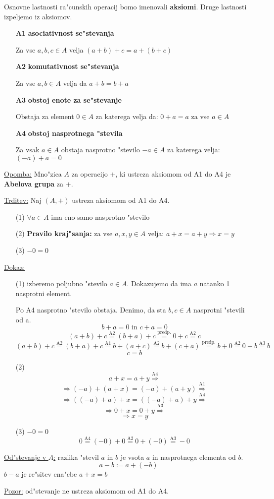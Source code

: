 Osnovne lastnosti ra"cunskih operacij bomo imenovali \textbf{aksiomi}. Druge lastnosti izpeljemo iz aksiomov.
\begin{itemize}
	\item[\textbf{A1}] \textbf{asociativnost se"stevanja}

	Za vse \(a, b, c \in A\) velja \((a + b) + c = a + (b + c)\)
	\item[\textbf{A2}] \textbf{komutativnost se"stevanja}
	
	Za vse \(a, b \in A\) velja da \(a + b = b + a\)
	
	\item[\textbf{A3}] \textbf{obstoj enote za se"stevanje}
	
	Obstaja za element \(0 \in A\) za katerega velja da: \(0 + a = a\) za vse \(a \in A\)
	
	\item[\textbf{A4}] \textbf{obstoj nasprotnega "stevila}
	
	Za vsak \(a \in A\) obstaja nasprotno "stevilo \(-a \in A\) za katerega velja: \((-a) + a = 0\)
\end{itemize}

\underline{Opomba:} Mno"zica \(A\) za operacijo \(+\), ki ustreza aksiomom od A1 do A4 je \textbf{Abelova grupa} za \(+\).

\underline{Trditev:} Naj \((A, +)\) ustreza aksiomom od A1 do A4.
\begin{itemize}
	\item[(1)] \(\forall a \in A \) ima eno samo nasprotno "stevilo
	\item[(2)] \textbf{Pravilo kraj"sanja:} za vse \(a, x, y \in A\) velja: \(a + x = a + y \Rightarrow x = y\)
	\item[(3)] \(-0 = 0\)
\end{itemize}

\underline{Dokaz:}
\begin{itemize}
	\item[(1)] izberemo poljubno "stevilo \(a \in A\). Dokazujemo da ima \(a\) natanko 1 nasprotni element.
	
	Po A4 nasprotno "stevilo obstaja. Denimo, da sta \(b, c \in A\) nasprotni "stevili od a.
	\[b + a = 0\text{ in }c + a = 0 \]
	\[(a + b) + c \stackrel{\text{A2}}{=} (b + a) + c \stackrel{\text{predp.}}{=} 0 + c \stackrel{\text{A2}}{=} c\]
	\[(a + b) + c\stackrel{\text{A2}}{=} (b + a) + c \stackrel{\text{A1}}{=} b + (a + c) \stackrel{\text{A2}}{=} b + (c + a) \stackrel{\text{predp.}}{=} b + 0 \stackrel{\text{A2}}{=} 0 + b \stackrel{\text{A3}}{=} b \]
	\[c = b\]
	
	\item[(2)]
	\[a + x = a + y \stackrel{\text{A4}}{\Rightarrow}\]
	\[\Rightarrow (-a) + (a + x) = (-a) + (a + y) \stackrel{\text{A1}}{\Rightarrow}\]
	\[\Rightarrow ((-a) + a) + x = ((-a) + a) + y \stackrel{\text{A4}}{\Rightarrow}\]
	\[\Rightarrow 0 + x = 0 + y \stackrel{\text{A3}}{\Rightarrow}\]
	\[\Rightarrow x = y\]
	
	\item[(3)] \(-0 = 0\)
	\[0 \stackrel{\text{A4}}{=} (-0) + 0 \stackrel{\text{A2}}{=} 0 + (-0) \stackrel{\text{A3}}{=} -0\]
\end{itemize}

\underline{Od"stevanje v \(A\):} razlika "stevil \(a\) in \(b\) je vsota \(a\) in nasprotnega elementa od \(b\).
\[a - b := a + (-b)\]
\(b-a\) je re"sitev ena"cbe \(a + x = b\)

\underline{Pozor:} od"stevanje ne ustreza aksiomom od A1 do A4.
